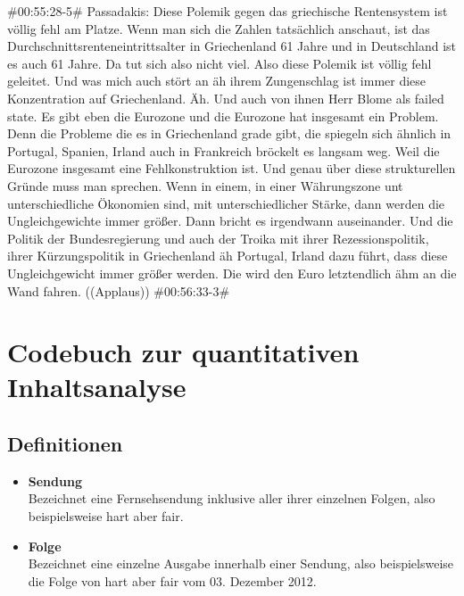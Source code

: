 {\begin{description}
	\begin{linenumbers}
		\item \#00:55:28-5\# Passadakis: Diese Polemik gegen das griechische Rentensystem ist völlig fehl am Platze. Wenn man sich die Zahlen tatsächlich anschaut, ist das Durchschnittsrenteneintrittsalter in Griechenland 61 Jahre und in Deutschland ist es auch 61 Jahre. Da tut sich also nicht viel. Also diese Polemik ist völlig fehl geleitet. Und was mich auch stört an äh ihrem Zungenschlag ist immer diese Konzentration auf Griechenland. Äh. Und auch von ihnen Herr Blome als failed state. Es gibt eben die Eurozone und die Eurozone hat insgesamt ein Problem. Denn die Probleme die es in Griechenland grade gibt, die spiegeln sich ähnlich in Portugal, Spanien, Irland auch in Frankreich bröckelt es langsam weg. Weil die Eurozone insgesamt eine Fehlkonstruktion ist. Und genau über diese strukturellen Gründe muss man sprechen. Wenn in einem, in einer Währungszone unt unterschiedliche Ökonomien sind, mit unterschiedlicher Stärke, dann werden die Ungleichgewichte immer größer. Dann bricht es irgendwann auseinander. Und die Politik der Bundesregierung und auch der Troika mit ihrer Rezessionspolitik, ihrer Kürzungspolitik in Griechenland äh Portugal, Irland dazu führt, dass diese Ungleichgewicht immer größer werden. Die wird den Euro letztendlich ähm an die Wand fahren. ((Applaus)) \#00:56:33-3\# 
	\end{linenumbers}
	\label{lis:37}
\end{description}

\section{Codebuch zur quantitativen Inhaltsanalyse}\label{anhang:codebuch}

\subsection{Definitionen}

\begin{itemize}
	\item \textbf{Sendung} \\
	Bezeichnet eine Fernsehsendung inklusive aller ihrer einzelnen Folgen, also beispielsweise hart aber fair.
	\item \textbf{Folge} \\
	Bezeichnet eine einzelne Ausgabe innerhalb einer Sendung, also beispielsweise die Folge von hart aber fair vom 03. Dezember 2012.
\end{itemize}

}

